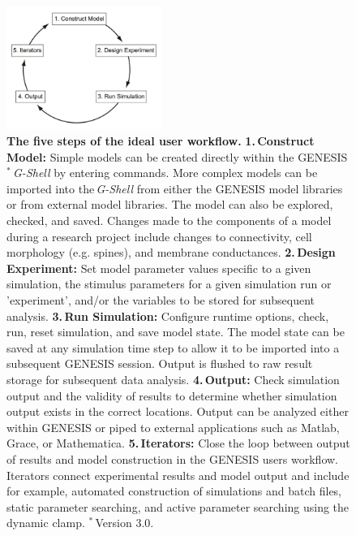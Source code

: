 \documentclass[11pt,3p,twocolumn]{JMN}
\begin{document}
\begin{figure}[h!t]
  \begin{center}
    \includegraphics[width=0.45\textwidth]{figures/user-workflow.pdf}
  \end{center}
  \vspace*{-\lineskip}
  \caption{ \small{{\bf The five steps of the ideal user workflow.} {\textbf{1.\,Construct Model:} Simple models can be created directly within the GENESIS$^*$\,\textit{G-Shell} by entering commands. More complex models can be imported into the\,\textit{G-Shell} from either the GENESIS model libraries or from external model libraries. The model can also be explored, checked, and saved. Changes made to the components of a model during a research project include changes to connectivity, cell morphology (e.g. spines), and membrane conductances. \textbf{2.\,Design Experiment:} Set model parameter values specific to a given simulation, the stimulus parameters for a given simulation run or 'experiment', and/or the variables to be stored for subsequent analysis.} \textbf{3.\,Run Simulation:} Configure runtime options, check, run, reset simulation, and save model state. The model state can be saved at any simulation time step to allow it to be imported into a subsequent GENESIS session. Output is flushed to raw result storage for subsequent data analysis. \textbf{4.\,Output:} Check simulation output and the validity of results to determine whether simulation output exists in the correct locations. Output can be analyzed either within GENESIS or piped to external applications such as Matlab, Grace, or Mathematica. \textbf{5.\,Iterators:} Close the loop between output of results and model construction in the GENESIS users workflow. Iterators connect experimental results and model output and include for example, automated construction of simulations and batch files, static parameter searching, and active parameter searching using the dynamic clamp. $^*$\,Version 3.0.}}
  \label{fig:user-workflow}
\end{figure}
\end{document}
